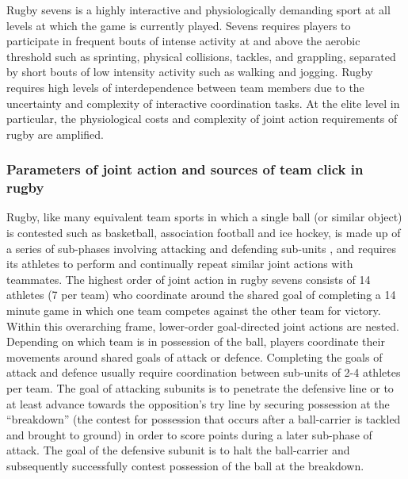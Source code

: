   Rugby sevens is a highly interactive and physiologically demanding sport at all levels at which the game is currently played. Sevens requires players to participate in frequent bouts of intense activity at and above the aerobic threshold such as sprinting, physical collisions, tackles, and grappling, separated by short bouts of low intensity activity such as walking and jogging. Rugby requires high levels of interdependence between team members due to the uncertainty and complexity of interactive coordination tasks.  At the elite level in particular, the physiological costs and complexity of joint action requirements of rugby are amplified.

  \subsubsection{Parameters of joint action and sources of team click in rugby}

  Rugby, like many equivalent team sports in which a single ball (or similar object) is contested such as basketball, association football and ice hockey, is made up of a series of sub-phases involving attacking and defending sub-units \citep{Passos2011}, and requires its athletes to perform and continually repeat similar joint actions with teammates.   The highest order of joint action in rugby sevens consists of 14 athletes (7 per team) who coordinate around the shared goal of completing a 14 minute game in which one team competes against the other team for victory.  Within this overarching frame, lower-order goal-directed joint actions are nested.  Depending on which team is in possession of the ball, players coordinate their movements around shared goals of attack or defence.  Completing the goals of attack and defence usually require coordination between sub-units of 2-4 athletes per team.  The goal of attacking subunits is to penetrate the defensive line or to at least advance towards the opposition's try line by securing possession at the ``breakdown'' (the contest for possession that occurs after a ball-carrier is tackled and brought to ground) in order to score points during a later sub-phase of attack.  The goal of the defensive subunit is to halt the ball-carrier and subsequently successfully contest possession of the ball at the breakdown.


